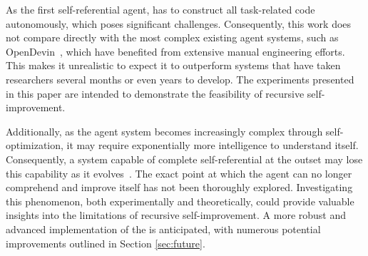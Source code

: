 As the first self-referential agent, \framework has to construct all task-related code autonomously, which poses significant challenges. Consequently, this work does not compare directly with the most complex existing agent systems, such as OpenDevin~\citep{wang2024opendevinopenplatformai}, which have benefited from extensive manual engineering efforts. 
This makes it unrealistic to expect it to outperform systems that have taken researchers several months or even years to develop. The experiments presented in this paper are intended to demonstrate the feasibility of recursive self-improvement. 


Additionally, as the agent system becomes increasingly complex through self-optimization, it may require exponentially more intelligence to understand itself. 
Consequently, a system capable of complete self-referential at the outset may lose this capability as it evolves~\citep{Yampolskiylimitation}. The exact point at which the agent can no longer comprehend and improve itself has not been thoroughly explored. Investigating this phenomenon, both experimentally and theoretically, could provide valuable insights into the limitations of recursive self-improvement.
A more robust and advanced implementation of the \framework is anticipated, with numerous potential improvements outlined in Section \ref{sec:future}. 